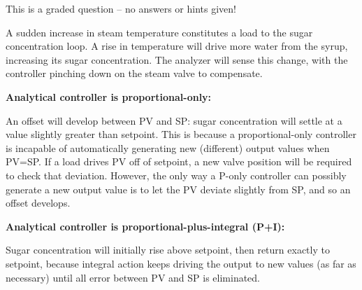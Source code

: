 \eject






This is a graded question -- no answers or hints given!







A sudden increase in steam temperature constitutes a load to the sugar concentration loop.  A rise in temperature will drive more water from the syrup, increasing its sugar concentration.  The analyzer will sense this change, with the controller pinching down on the steam valve to compensate.  

\vskip 10pt

\noindent
{\bf Analytical controller is proportional-only:}

An offset will develop between PV and SP: sugar concentration will settle at a value slightly greater than setpoint.  This is because a proportional-only controller is incapable of automatically generating new (different) output values when PV=SP.  If a load drives PV off of setpoint, a new valve position will be required to check that deviation.  However, the only way a P-only controller can possibly generate a new output value is to let the PV deviate slightly from SP, and so an offset develops.

\vskip 10pt

\noindent
{\bf Analytical controller is proportional-plus-integral (P+I):}

Sugar concentration will initially rise above setpoint, then return exactly to setpoint, because integral action keeps driving the output to new values (as far as necessary) until all error between PV and SP is eliminated.





